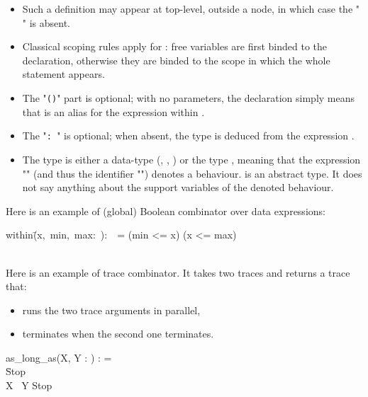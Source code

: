 \begin{itemize}

\item Such a  definition may appear at top-level,  outside a node, in
  which case the "{\tt {} }" is absent.

\item Classical scoping rules apply for : free variables are
  first binded  to the   declaration, otherwise  they are
  binded to the scope in which the whole statement appears.

\item  The   "{\tt  ()}"   part  is  optional;   with  no
  parameters, the declaration simply  means that  is an alias
  for the expression  within .

\item The "{\tt :~}" is  optional; when absent, the type is
  deduced from the expression .

\item  The  type  is   either  a  data-type  (,  ,
  ) or  the type  , meaning that  the expression
  ""  (and   thus  the  identifier   "")  denotes  a
  behaviour.    is  an  abstract type.   It  does not  say
  anything about the support variables of the denoted behaviour.
\end{itemize}

 Here  is  an  example  of  (global)  Boolean  combinator  over  data
 expressions: \

\begin{example}
\begin{program}
 within\=(x,~min,~max:~):~~=  (min <= x)  (x <= max)
\end{program}
\end{example}
~\\

Here  is an example  of trace  combinator.  It  takes two  traces and
returns a trace that:
\begin{itemize}
\item runs the two trace arguments in parallel,
\item terminates when the second one terminates.
\end{itemize}
\begin{example}
\begin{program}
 as\_long\_as(X, Y : ) :  = \\
    \>  \= Stop \\
    \>      \> X  \EA~\OB Y   Stop\CB\\
    \> \CB
\end{program}
\end{example}


